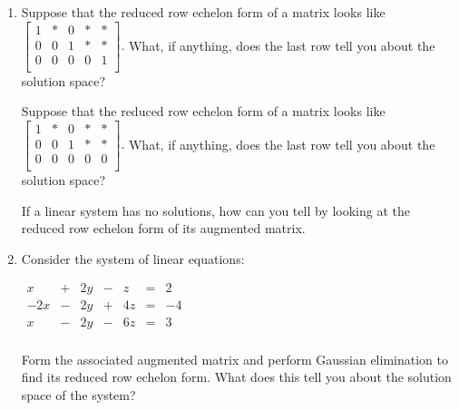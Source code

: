 \documentclass[12pt]{article}
\newcommand{\ds}{\displaystyle}
\newcommand{\vs}[1]{\vspace{#1in}}
\begin{document}
\begin{enumerate}
  \vs{2}
\item Suppose that the reduced row echelon form of a matrix looks like
  $\ds
  \left[
    \begin{array}{rrrr|r}
      1 & * & 0 & * & * \\
      0 & 0 & 1 & * & * \\
      0 & 0 & 0 & 0 & 1 \\
    \end{array}
  \right].
  $
  What, if anything, does the last row tell you about the solution
  space?  

  \vs{1}
  Suppose that the reduced row echelon form of a matrix looks like
  $\ds
  \left[
    \begin{array}{rrrr|r}
      1 & * & 0 & * & * \\
      0 & 0 & 1 & * & * \\
      0 & 0 & 0 & 0 & 0 \\
    \end{array}
  \right].
  $
  What, if anything, does the last row tell you about the solution
  space?

  \vs{1}
  \newpage
  If a linear system has no solutions, how can you tell by looking at
  the reduced row echelon form of its augmented matrix.

  \vs{1}

\item Consider the system of linear equations:

  $\ds
  \begin{alignedat}{4}
    x &  {}+{}  & 2y &  {}-{}  & z &  {}={}  & 2 \\
    -2x &  {}-{}  & 2y &  {}+{}  & 4z &  {}={}  & -4 \\
    x & {}-{} & 2y &  {}-{}  & 6z &  {}={}  & 3 \\
  \end{alignedat}
  $

  Form the associated augmented matrix and perform Gaussian
  elimination to find its reduced row echelon form.  What does this
  tell you about the solution space of the system?

  \vs{3}
  
  
  
  \end{enumerate}
\end{document}
